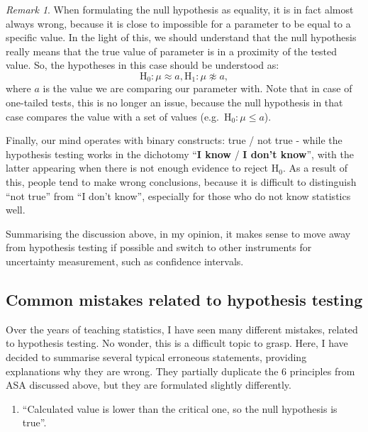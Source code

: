 \documentclass[
]{book}
\providecommand{\tightlist}{%
  \setlength{\itemsep}{0pt}\setlength{\parskip}{0pt}}
\theoremstyle{definition}
\theoremstyle{definition}
\theoremstyle{definition}
\theoremstyle{definition}
\theoremstyle{remark}
\newtheorem*{remark}{Remark}
\begin{document}
\begin{remark}
When formulating the null hypothesis as equality, it is in fact almost always wrong, because it is close to impossible for a parameter to be equal to a specific value. In the light of this, we should understand that the null hypothesis really means that the true value of parameter is in a proximity of the tested value. So, the hypotheses in this case should be understood as:
\begin{equation*}
    \mathrm{H}_0: \mu \approx a, \mathrm{H}_1: \mu \not\approx a ,
\end{equation*}
where \(a\) is the value we are comparing our parameter with. Note that in case of one-tailed tests, this is no longer an issue, because the null hypothesis in that case compares the value with a set of values (e.g.~\(\mathrm{H}_0: \mu\leq a\)).
\end{remark}

Finally, our mind operates with binary constructs: true / not true - while the hypothesis testing works in the dichotomy ``\textbf{I know} / \textbf{I don't know}'', with the latter appearing when there is not enough evidence to reject \(\mathrm{H}_0\). As a result of this, people tend to make wrong conclusions, because it is difficult to distinguish ``not true'' from ``I don't know'', especially for those who do not know statistics well.

Summarising the discussion above, in my opinion, it makes sense to move away from hypothesis testing if possible and switch to other instruments for uncertainty measurement, such as confidence intervals.

\subsection{Common mistakes related to hypothesis testing}\label{hypothesisTestingMistakes}

Over the years of teaching statistics, I have seen many different mistakes, related to hypothesis testing. No wonder, this is a difficult topic to grasp. Here, I have decided to summarise several typical erroneous statements, providing explanations why they are wrong. They partially duplicate the 6 principles from ASA discussed above, but they are formulated slightly differently.

\begin{enumerate}
\def\labelenumi{\arabic{enumi}.}
\tightlist
\item
  ``Calculated value is lower than the critical one, so the null hypothesis is true''.
\end{enumerate}
\end{document}
